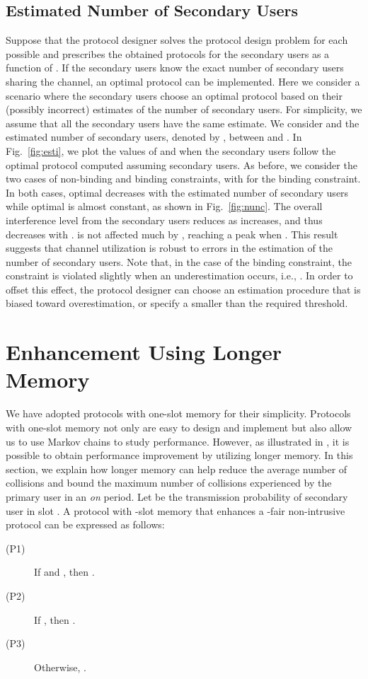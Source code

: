 \documentclass[12pt,draftclsnofoot,onecolumn]{IEEEtran}
\begin{document}
\subsection{Estimated Number of Secondary Users}

Suppose that the protocol designer solves the protocol design problem
for each possible  and prescribes the obtained protocols for the secondary users as a function of .
If the secondary users know the exact number of secondary users sharing the channel,
an optimal protocol can be implemented. Here we consider a scenario where
the secondary users choose an optimal protocol based on their (possibly incorrect)
estimates of the number of secondary users.
For simplicity, we assume that all the secondary users have the same estimate. We consider  and
the estimated number of secondary users, denoted by , between  and .
In Fig.~\ref{fig:esti}, we plot the values of  and 
when the  secondary users follow the optimal protocol computed assuming  secondary users.
As before, we consider the two cases of non-binding and binding constraints, with  for the binding
constraint. In both cases, optimal  decreases with the estimated number of secondary users
while optimal  is almost constant, as shown in Fig.~\ref{fig:nunc}.
The overall interference level from the secondary users reduces as  increases,
and thus  decreases with .
 is not affected much by , reaching a peak when .
This result suggests that channel utilization
is robust to errors in the estimation of the number of secondary users.
Note that, in the case of the binding constraint, the constraint is violated slightly when an
underestimation occurs, i.e., .
In order to offset this effect, the protocol designer can choose an estimation procedure
that is biased toward overestimation, or specify a smaller  than the required threshold.

\section{Enhancement Using Longer Memory}

We have adopted protocols with one-slot memory for their simplicity.
Protocols with one-slot memory not only are easy to design and implement
but also allow us to use Markov chains to study performance.
However, as illustrated in \cite{park}, it is possible to obtain performance improvement
by utilizing longer memory. In this section, we explain how longer memory can
help reduce the average number of collisions
and bound the maximum number of collisions experienced by the primary user in an \emph{on} period.
Let  be the transmission probability of secondary user  in slot .
A protocol with -slot memory that enhances a -fair non-intrusive protocol 
can be expressed as follows:
\begin{description}
\item[(P1)] If  and , then .

\item[(P2)] If , then .

\item[(P3)] Otherwise, .
\end{description}
\end{document}
